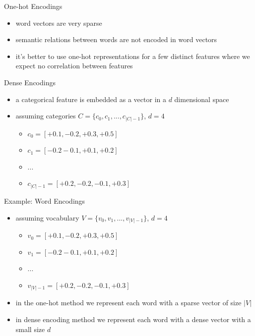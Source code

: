 \documentclass[12pt, handout]{beamer}
\begin{document}



\begin{frame}{One-hot Encodings}
	\begin{itemize}
		\item<1-> word vectors are very sparse 
		\item<2-> semantic relations between words are not encoded in word vectors
		\item<3-> it's better to use one-hot representations for a few distinct features where we expect no correlation between features
\end{itemize}\end{frame}

\begin{frame}{Dense Encodings}
	\begin{itemize}
		\item<1-> a categorical feature is embedded as a vector in a $d$ dimensional space
		\item<2-> assuming categories $C = \{ c_0,c_1,..., c_{|C|-1} \}$, $d=4$
		\begin{itemize}
			\item<3-> $c_0 = [+0.1,-0.2,+0.3,+0.5]$
			\item<4-> $c_1 = [-0.2-0.1,+0.1,+0.2]$
			\item<4-> ...
			\item<4-> $c_{|C|-1} = [+0.2,-0.2,-0.1,+0.3]$
		\end{itemize}
	\end{itemize}
\end{frame}
\begin{frame}{Example: Word Encodings}
	\begin{itemize}
		\item<1-> assuming vocabulary $V = \{ v_0,v_1,..., v_{|V|-1} \}$, $d=4$
		\begin{itemize}
			\item<2-> $v_0 = [+0.1,-0.2,+0.3,+0.5]$
			\item<2-> $v_1 = [-0.2-0.1,+0.1,+0.2]$
			\item<2-> ...
			\item<2-> $v_{|V|-1} = [+0.2,-0.2,-0.1,+0.3]$
		\end{itemize}
		\item<3-> in the one-hot method we represent each word with a sparse vector of size $|V|$
		\item<4-> in dense encoding method we represent each word with a dense vector with a small size $d$
	\end{itemize}
\end{frame}
\end{document}
